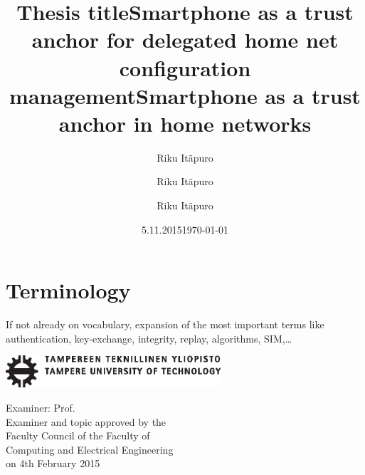 \documentclass[12pt,a4paper,english]{tutthesis}
\author{Riku Itäpuro}
\title{Thesis title}      %
\author{Riku Itäpuro}
\title{Smartphone as a trust anchor for delegated home net configuration management}
\author{Riku Itäpuro}
\date{5.11.2015}
\title{Smartphone as a trust anchor in home networks}
\begin{document}
\maketitle



\chapter*{Terminology}
\markboth{}{}                                %

If not already on vocabulary, expansion of the most important terms like
authentication, key-exchange, integrity, replay, algorithms, SIM,\ldots{}

\newpage             %

 \pagestyle{headings}
 \thispagestyle{empty}
\date\today
 \vspace*{-.5cm}\noindent
 \includegraphics[width=8cm]{tty_tut_logo}   %

\vspace{6.8cm}
\maketitle
\vspace{6.7cm} %

\begin{flushright}  
  \begin{minipage}[c]{6.8cm}
    \begin{spacing}{1.0}
      \textsf{Examiner: Prof. \@examiner}\\
      \textsf{Examiner and topic approved by the}\\ 
      \textsf{Faculty Council of the Faculty of} \\
      \textsf{Computing and Electrical Engineering} \\
      \textsf{on 4th February 2015}\\
    \end{spacing}
  \end{minipage}
\end{flushright}
\end{document}
